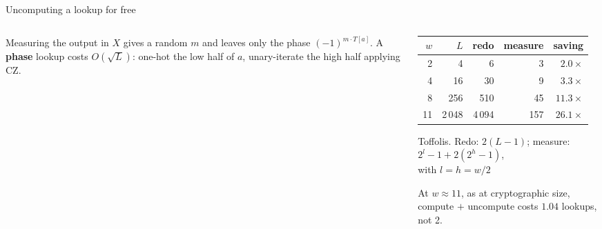 \documentclass[aspectratio=169,11pt]{beamer}
\newcommand{\bundle}[3]{\draw[thick,color=body] (#1-0.07,#2-0.13) -- (#1+0.07,#2+0.13);
  \node[font=\tiny,color=subtle,above right=-1pt] at (#1,#2) {#3};}
\begin{document}
\setcounter{framenumber}{58}
\begin{frame}{Uncomputing a lookup for free}
  \begin{columns}[c]
    \begin{column}{0.5\textwidth}
      \centering
      \vskip2mm
      \raggedright\small
      Measuring the output in $X$ gives a random $m$ and leaves only the phase $(-1)^{m\cdot T[a]}$. A \textbf{phase} lookup costs $O(\sqrt L)$: one-hot the low half of $a$, unary-iterate the high half applying CZ.
    \end{column}
    \begin{column}{0.46\textwidth}
      \centering\footnotesize
      \renewcommand{\arraystretch}{1.12}
      \begin{tabular}{@{}rrrrr@{}}
        \toprule
        $w$ & $L$ & redo & measure & saving \\
        \midrule
        2 & 4 & 6 & 3 & $2.0\times$ \\
        4 & 16 & 30 & 9 & $3.3\times$ \\
        8 & 256 & 510 & 45 & $11.3\times$ \\
        11 & 2\,048 & 4\,094 & 157 & $\mathbf{26.1\times}$ \\
        \bottomrule
      \end{tabular}\par
      {\scriptsize Toffolis. Redo: $2(L-1)$; measure: $2^l-1+2(2^h-1)$,\\ with $l=h=w/2$}
      \vskip2mm
      \begin{greyblock}[fontupper=\small]
        At $w\approx11$, as at cryptographic size, compute $+$ uncompute costs $1.04$ lookups, not 2.
      \end{greyblock}
    \end{column}
  \end{columns}
\end{frame}
\end{document}
